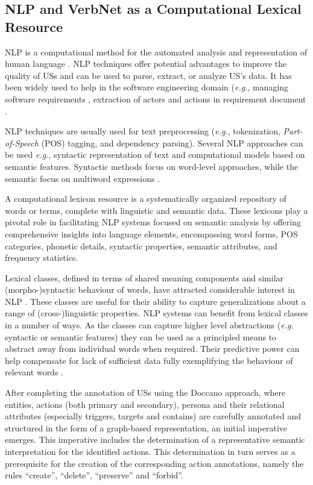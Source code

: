 \subsection{NLP and VerbNet as a Computational Lexical Resource}\label{nlp}
NLP is a computational method for the automated analysis and representation of human language \cite{cambria2014jumping}. NLP techniques offer potential advantages to improve the quality of USs and can be used to parse, extract, or analyze US's data. It has been widely used to help in the software engineering domain (\emph{e.g.}, managing software requirements \cite{Arias2018}, extraction of actors and actions in requirement document \cite{al2018use}.

NLP techniques are usually used for text preprocessing (\emph{e.g.}, tokenization, \emph{Part-of-Speech} (POS) tagging, and dependency parsing). Several NLP approaches can be used \emph{e.g.}, syntactic representation of text and computational models based on semantic features. Syntactic methods focus on word-level approaches, while the semantic focus on multiword expressions \cite{cambria2014jumping}.

A computational lexicon resource is a systematically organized repository of words or terms, complete with linguistic and semantic data. These lexicons play a pivotal role in facilitating NLP systems focused on semantic analysis by offering comprehensive insights into language elements, encompassing word forms, POS categories, phonetic details, syntactic properties, semantic attributes, and frequency statistics. 

Lexical classes, defined in terms of shared meaning components and similar (morpho-)syntactic behaviour of words, have attracted considerable interest in NLP \cite{cambria2014jumping}. These classes are useful for their ability to capture generalizations about a range of (cross-)linguistic properties. NLP systems can benefit from lexical classes in a number of ways. As the classes can capture higher level abstractions (\emph{e.g.} syntactic or semantic features) they can be used as a principled means to abstract away from individual words when required. Their predictive power can help compensate for lack of sufficient data fully exemplifying the behaviour of relevant words \cite{kipper2006extending}.

After completing the annotation of USs using the Doccano approach, where entities, actions (both primary and secondary), persona and their relational attributes (especially triggers, targets and contains) are carefully annotated and structured in the form of a graph-based representation, an initial imperative emerges. This imperative includes the determination of a representative semantic interpretation for the identified actions. This determination in turn serves as a prerequisite for the creation of the corresponding action annotations, namely the rules \enquote{create}, \enquote{delete}, \enquote{preserve} and \enquote{forbid}. 


